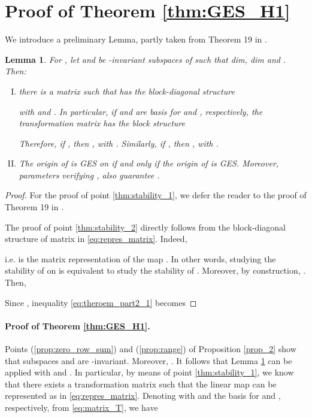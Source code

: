 \documentclass[a4paper]{article}
\theoremstyle{plain}
\newtheorem{lem}{Lemma}
\begin{document}
     \appendix
    \section{Proof of Theorem \ref{thm:GES_H1}}
\label{appendix_1}
We introduce a preliminary Lemma, partly taken from Theorem 19 in \cite{callier2012linear}.
\begin{lem}
	\label{lem:stability}
	For , let  and  be -invariant subspaces of  such that dim, dim and . Then:
	\begin{enumerate}[I)]
		\item \label{thm:stability_1} there is a matrix  such that  has the block-diagonal structure 
		
		with  and .
		In particular, if  and  are basis for  and , respectively, the transformation matrix  has the block structure
		
		Therefore, if , then , with . Similarly, if , then , with .
		\item\label{thm:stability_2} The origin of  is GES on  if and only if the origin of   is GES. Moreover, parameters  verifying , also guarantee .
	\end{enumerate}
\end{lem}
\begin{proof}
	For the proof of point \ref{thm:stability_1}, we defer the reader to the proof of Theorem 19 in \cite{callier2012linear}.
	
	The proof of point \ref{thm:stability_2} directly follows from the block-diagonal structure of matrix  in \eqref{eq:repres_matrix}. Indeed,
	
	i.e.  is the matrix representation of the map . In other words, studying the stability of  on  is equivalent to study the stability of . 
	Moreover, by construction, . Then,
	
	Since , inequality \eqref{eq:theroem_part2_1} becomes
	
\end{proof}
\paragraph{Proof of Theorem \ref{thm:GES_H1}.}
\label{app:GES_H1}
Points (\ref{prop:zero_row_sum}) and (\ref{prop:range}) of Proposition \ref{prop_2} show that subspaces  and  are -invariant. Moreover, . It follows that Lemma \ref{lem:stability} can be applied with  and . In particular, by means of point \ref{thm:stability_1}, we know that there exists a transformation matrix  such that the linear map  can be represented as in \eqref{eq:repres_matrix}. Denoting with  and  the basis for  and , respectively, from \eqref{eq:matrix_T}, we have
\end{document}
